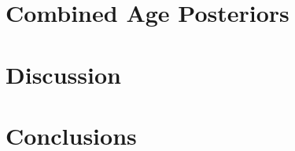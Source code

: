 \documentclass{aastex631}
\begin{document}




\section{Combined Age Posteriors} \label{sec:total_ages}




\section{Discussion} \label{sec:discus}

 


\section{Conclusions} \label{sec:con}


\end{document}
